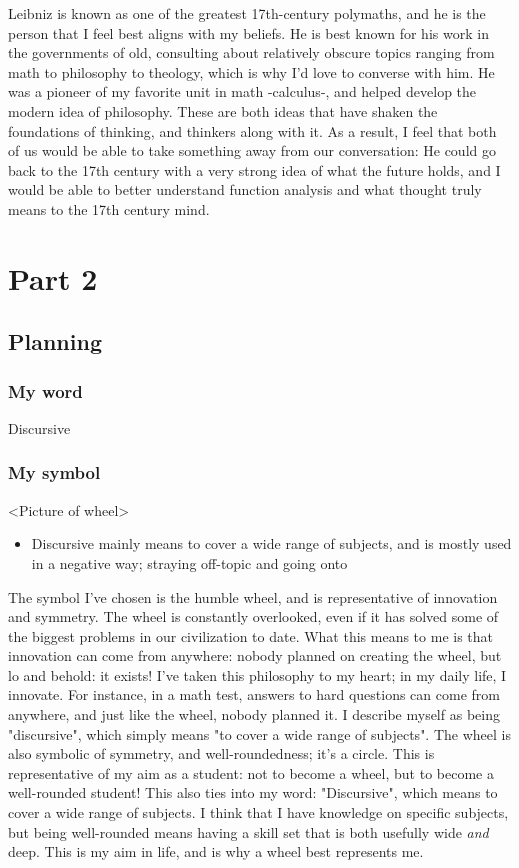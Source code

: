 \documentclass[]{article}
\begin{document}
Leibniz is known as one of the greatest 17th-century polymaths, and he is the person that I feel best aligns with my beliefs. He is best known for his work in the governments of old, consulting about relatively obscure topics ranging from math to philosophy to theology, which is why I'd love to converse with him. 
He was a pioneer of my favorite unit in math -calculus-, and helped develop the modern idea of philosophy. These are both ideas that have shaken the foundations of thinking, and thinkers along with it. As a result, I feel that both of us would be able to take something away from our conversation: He could go back to the 17th century with a very strong idea of what the future holds, and I would be able to better understand function analysis and what thought truly means to the 17\textup{th} century mind.


\section*{Part 2}
\subsection*{Planning}
\subsubsection*{My word}
Discursive
\subsubsection*{My symbol}
<Picture of wheel>

\begin{itemize}
    \item Discursive mainly means to cover a wide range of subjects, and is mostly used in a negative way; straying off-topic and going onto 
\end{itemize}

The symbol I've chosen is the humble wheel, and is representative of innovation and symmetry. The wheel is constantly overlooked, even if it has solved some of the biggest problems in our civilization to date. What this means to me is that innovation can come from anywhere: nobody planned on creating the wheel, but lo and behold: it exists! I've taken this philosophy to my heart; in my daily life, I innovate. For instance, in a math test, answers to hard questions can come from anywhere, and just like the wheel, nobody planned it. I describe myself as being "discursive", which simply means "to cover a wide range of subjects". The wheel is also symbolic of symmetry, and well-roundedness; it's a circle. This is representative of my aim as a student: not to become a wheel, but to become a well-rounded student! This also ties into my word: "Discursive", which means to cover a wide range of subjects. I think that I have knowledge on specific subjects, but being well-rounded means having a skill set that is both usefully wide \textit{and} deep. This is my aim in life, and is why a wheel best represents me.
\end{document}
